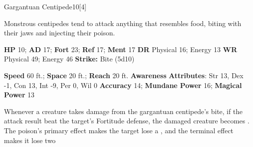   
  \begin{monsection}{Gargantuan Centipede}{10}[4]
    \vspace{-1em}\vspace{-1em}
    \vspace{0em}

    
    Monstrous centipedes tend to attack anything that resembles food, biting with their jaws and injecting their poison.
  

    \begin{spellcontent}
      \begin{spelltargetinginfo}
        \pari \textbf{HP} 10;
          \textbf{AD} 17;
          \textbf{Fort} 23;
          \textbf{Ref} 17;
          \textbf{Ment} 17
        \pari \textbf{DR} Physical 16; Energy 13
        \pari \textbf{WR} Physical 49; Energy 46
        \pari \textbf{Strike:}
            Bite  (5d10)
      \end{spelltargetinginfo}
    \end{spellcontent}
    \begin{monsterfooter}
      \pari \textbf{Speed} 60 ft.;
        \textbf{Space} 20 ft.;
        \textbf{Reach} 20 ft.
      \pari \textbf{Awareness} 
      \pari \textbf{Attributes}:
        Str 13, Dex -1,
        Con 13, Int -9,
        Per 0, Wil 0
      \pari \textbf{Accuracy} 14;
        \textbf{Mundane Power} 16;
      \textbf{Magical Power} 13
    \end{monsterfooter}
  \end{monsection}
    Whenever a creature takes damage from the gargantuan centipede's bite,
      if the attack result beat the target's Fortitude defense,
      the damaged creature becomes .
    The poison's primary effect makes the target lose a , and the terminal effect makes it lose two 
  

